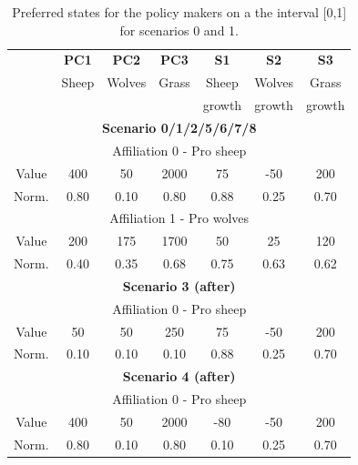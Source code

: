 \documentclass[12pt]{article}
\begin{document}

\begin{table}[h!]
\begin{center}
\begin{tabular}{ |c|c|c|c|c|c|c| } 
\hline

			& {\bfseries PC1}
					&  {\bfseries PC2}
							&  {\bfseries PC3}
									&  {\bfseries S1}	
											&  {\bfseries S2}	
													&  {\bfseries S3}  	\\ 
			& Sheep	& Wolves	& Grass	& Sheep	& Wolves	& Grass 	\\
			&		&		&		& growth	& growth	& growth	\\ \hline \hline \hline
\multicolumn{7}{|c|}{ {\bfseries Scenario 0/1/2/5/6/7/8}}					\\ \hline \hline	
\multicolumn{7}{|c|}{Affiliation 0 - Pro sheep}							\\ \hline 
Value		& 400	& 50		& 2000	& 75		& -50	& 200	\\ \hline
Norm.		& 0.80	& 0.10	& 0.80	& 0.88	& 0.25	& 0.70	\\ \hline
\multicolumn{7}{|c|}{Affiliation 1 - Pro wolves}							\\ \hline 
Value		& 200	& 175	& 1700	& 50		& 25		& 120	\\ \hline
Norm.		& 0.40	& 0.35	& 0.68	& 0.75	& 0.63	& 0.62	\\ \hline
\multicolumn{7}{|c|}{ {\bfseries Scenario 3 (after)}}						\\ \hline \hline	
\multicolumn{7}{|c|}{Affiliation 0 - Pro sheep}							\\ \hline 
Value		& 50	 	& 50		& 250	& 75		& -50	& 200	\\ \hline
Norm.		& 0.10	& 0.10	& 0.10	& 0.88	& 0.25	& 0.70	\\ \hline
\multicolumn{7}{|c|}{ {\bfseries Scenario 4 (after)}}						\\ \hline \hline	
\multicolumn{7}{|c|}{Affiliation 0 - Pro sheep}							\\ \hline 
Value		& 400	& 50		& 2000	& -80	& -50	& 200	\\ \hline
Norm.		& 0.80	& 0.10	& 0.80	& 0.10	& 0.25	& 0.70	\\ \hline

\end{tabular}
\end{center}
\caption{Preferred states for the policy makers on a the interval [0,1] for scenarios 0 and 1.}
\label{tab:preferredStates}
\end{table}
\end{document}
